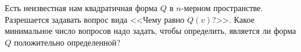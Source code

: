 \documentclass{article}
\begin{document}
Есть неизвестная нам квадратичная форма $Q$ в $n$-мерном пространстве. Разрешается задавать вопрос вида <<Чему равно $Q(v)$?>>. 
Какое минимальное число вопросов надо задать, чтобы определить, является ли форма $Q$ положительно определенной?
\end{document}
